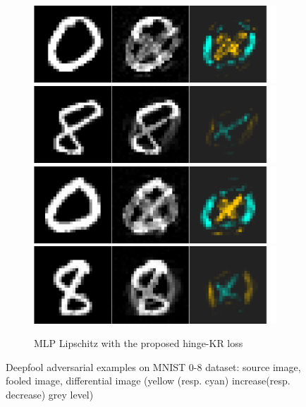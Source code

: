 \documentclass{article}
\begin{document}
\begin{figure}
\begin{subfigure}{1\textwidth}
  \centering
  \includegraphics[width=0.24\linewidth]{img/fooling/model_MLP_Bjorck_FullSort_hKR_src_and_adv_22.png}
  \includegraphics[width=0.24\linewidth]{img/fooling/model_MLP_Bjorck_FullSort_hKR_src_and_adv_34.png}
  \includegraphics[width=0.24\linewidth]{img/fooling/model_MLP_Bjorck_FullSort_hKR_src_and_adv_42.png}
  \includegraphics[width=0.24\linewidth]{img/fooling/model_MLP_Bjorck_FullSort_hKR_src_and_adv_56.png}
  \caption{MLP Lipschitz with the proposed hinge-KR loss}
\end{subfigure}


\caption{Deepfool adversarial examples on MNIST 0-8 dataset: source image, fooled image, differential image (yellow (resp. cyan) increase(resp. decrease) grey level)}
\label{fig:Deep_fool_MNIST08}
\end{figure}
\end{document}
